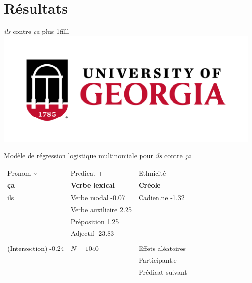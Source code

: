 \documentclass{beamer}\usepackage[]{graphicx}\usepackage[]{xcolor}
\newcommand{\Logo}{{\hskip0pt plus 1filll \includegraphics[scale=0.028]{uga_logo.png}}}
\newcommand{\lexi}[1]{\textit{#1}}
\begin{document}
  \section{Résultats}

\begin{frame}{\lexi{ils} contre \lexi{ça}\Logo}
\footnotesize
  \begin{center}
    Modèle de régression logistique multinomiale pour \lexi{ils} contre \lexi{ça}

    \begin{tabular}{p{3cm} p{3cm} p{3cm}}
                                                                                                       &                                                                                                    & \\
      \hline
      Pronom \hfill \~{}                                                                               & Predicat \hfill +                                                                                  & Ethnicité \\
      \hline
      \textbf{ça}                                                                                      & \textbf{Verbe lexical}                                                                             & \textbf{Créole} \\
      ils                                                                                              & Verbe modal \hfill -0.07               & Cadien.ne \hfill -1.32 \\
                                                                                                       & Verbe auxiliaire \hfill 2.25      & \\
                                                                                                       & Préposition \hfill 1.25         & \\
                                                                                                       & Adjectif \hfill -23.83              & \\
                                                                                                       & & \\
      \hline
      (Intersection) \hfill -0.24            & $N = 1040$                                               & Effets aléatoires \\
      \hline
                                                                                                       &                                                                                                    & Participant.e \\
                                                                                                       &                                                                                                    & Prédicat suivant \\
    \end{tabular}
  \end{center}
\end{frame}
\end{document}
